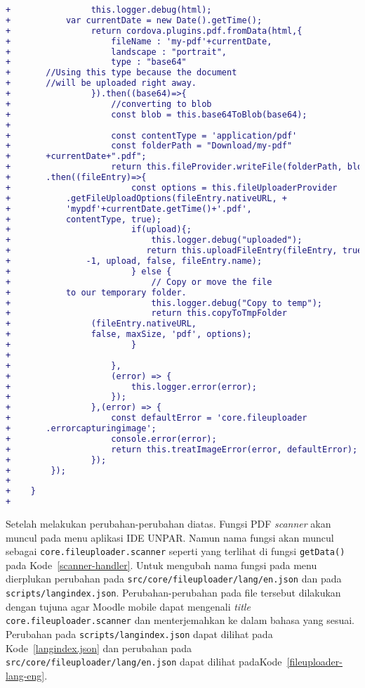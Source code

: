 \begin{lstlisting}[language=diff, frame=single, label ={fileuploader-helper}, caption = Perubahan pada \texttt{src/core/fileuploader/providers/helper.ts} ]
+                this.logger.debug(html);
+ 	        var currentDate = new Date().getTime();
+                return cordova.plugins.pdf.fromData(html,{
+                    fileName : 'my-pdf'+currentDate,
+                    landscape : "portrait",
+                    type : "base64" 
+		//Using this type because the document 
+		//will be uploaded right away.
+                }).then((base64)=>{   
+                    //converting to blob
+                    const blob = this.base64ToBlob(base64);
+                    
+                    const contentType = 'application/pdf'
+                    const folderPath = "Download/my-pdf"
+ 		+currentDate+".pdf";
+                    return this.fileProvider.writeFile(folderPath, blob)
+		.then((fileEntry)=>{
+                        const options = this.fileUploaderProvider
+			.getFileUploadOptions(fileEntry.nativeURL, +	
+			'mypdf'+currentDate.getTime()+'.pdf',  
+			contentType, true);
+                        if(upload){;
+                            this.logger.debug("uploaded");
+                           return this.uploadFileEntry(fileEntry, true, 
+ 		        -1, upload, false, fileEntry.name);
+                        } else {
+                            // Copy or move the file 
+			to our temporary folder.
+                            this.logger.debug("Copy to temp");
+                            return this.copyToTmpFolder
+ 		         (fileEntry.nativeURL, 
+ 		         false, maxSize, 'pdf', options);
+                        }
+                    
+                    },
+                    (error) => {
+                        this.logger.error(error);
+                    });
+                },(error) => {
+                    const defaultError = 'core.fileuploader
+		.errorcapturingimage';
+                    console.error(error);
+                    return this.treatImageError(error, defaultError);
+                });
+        });
+    
+    }
+
\end{lstlisting}


Setelah melakukan perubahan-perubahan diatas. Fungsi PDF \textit{scanner} akan muncul pada menu aplikasi IDE UNPAR. Namun nama fungsi akan muncul sebagai \texttt{core.fileuploader.scanner} seperti yang terlihat di fungsi \texttt{getData()} pada \mbox{Kode \ref{scanner-handler}}. Untuk mengubah nama fungsi pada menu dierplukan perubahan pada \texttt{src/core/fileuploader/lang/en.json} dan pada \texttt{scripts/langindex.json}. Perubahan-perubahan pada file tersebut dilakukan dengan tujuna agar Moodle mobile dapat mengenali \textit{title} \texttt{core.fileuploader.scanner} dan menterjemahkan ke dalam bahasa yang sesuai.  Perubahan pada \texttt{scripts/langindex.json} dapat dilihat pada \mbox{Kode \ref{langindex.json}} dan perubahan pada \texttt{src/core/fileuploader/lang/en.json} dapat dilihat pada\mbox{Kode \ref{fileuploader-lang-eng}}.

